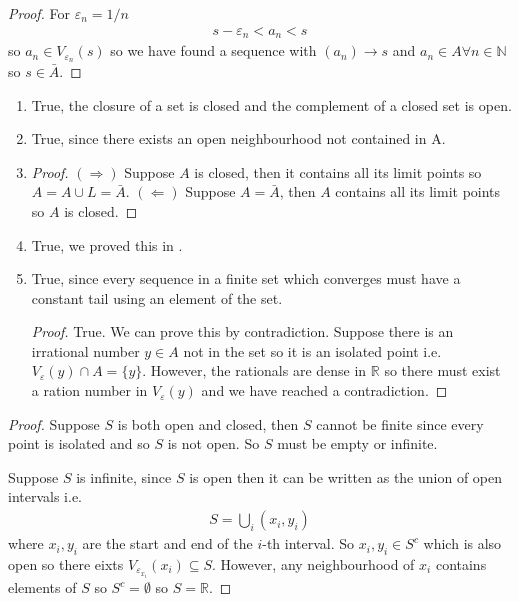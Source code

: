 \begin{proof}
    For $\varepsilon_n=1/n$
    \begin{align*}
        s-\varepsilon_n < a_n < s
    \end{align*}
    so $a_n \in V_{\varepsilon_n}(s)$ so we have found a sequence with 
    $(a_n) \rightarrow s$ and $a_n \in A \forall n\in \mathbb{N}$
    so $s \in \bar A$.
\end{proof}

\begin{enumerate}[label=(\alph*)]
    \item True, the closure of a set is closed and the complement of a closed set is open.
    \item True, since there exists an open neighbourhood not contained in A.
    \item \begin{proof}
        $(\Rightarrow)$ Suppose $A$ is closed, then it contains all its limit points
        so $A=A\cup L=\bar A$.
        $(\Leftarrow)$ Suppose $A=\bar A$, then $A$ contains all its limit points so $A$ 
        is closed.
    \end{proof}
    \item True, we proved this in .
    \item True, since every sequence in a finite set which converges must have a constant tail
    using an element of the set.
    \begin{proof}
        True. We can prove this by contradiction. Suppose there is an irrational number $y\in A$ not
        in the set so it is an isolated point i.e. $V_\varepsilon(y)\cap A = \{y\}$.
        However, the rationals are dense in $\mathbb{R}$ so there must exist a ration number 
        in $V_\varepsilon(y)$ and we have reached a contradiction.
    \end{proof}
\end{enumerate}

\begin{proof}
    Suppose $S$ is both open and closed, then $S$ cannot be finite
    since every point is isolated and so $S$ is not open. So $S$ must be
    empty or infinite.

    Suppose $S$ is infinite, since $S$ is open then it can be written as the union of open intervals
    i.e.
    \begin{align*}
        S = \bigcup_i (x_i, y_{i})
    \end{align*}
    where $x_i, y_{i}$ are the start and end of the $i$-th interval.
    So $x_i, y_i \in S^c$ which is also open so there eixts $V_{\varepsilon_{x_i}}(x_i) \subseteq S$.
    However, any neighbourhood of $x_i$ contains elements of $S$ so $S^c=\emptyset$ so $S=\mathbb{R}$. 
\end{proof}

